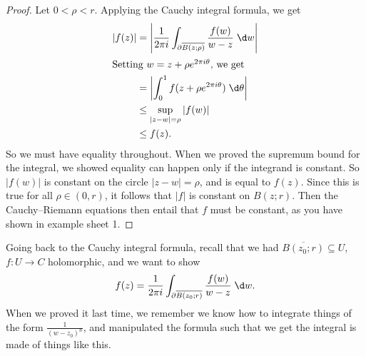 \documentclass[a4paper]{article}
\begin{document}
\begin{proof}
  Let $0 < \rho < r$. Applying the Cauchy integral formula, we get
  \begin{align*}
    |f(z)| &= \left|\frac{1}{2\pi i}\int_{\partial \overline{B(z; \rho)}} \frac{f(w)}{w - z}\;\d w\right|\\
    \intertext{Setting $w = z + \rho e^{2\pi i\theta}$, we get}
    &= \left|\int_0^1 f(z + \rho e^{2 \pi i \theta})\;\d \theta\right|\\
    &\leq \sup_{|z - w| = \rho} |f(w)|\\
    &\leq f(z).
  \end{align*}
  So we must have equality throughout. When we proved the supremum bound for the integral, we showed equality can happen only if the integrand is constant. So $|f(w)|$ is constant on the circle $|z - w| = \rho$, and is equal to $f(z)$. Since this is true for all $\rho \in (0, r)$, it follows that $|f|$ is constant on $B(z; r)$. Then the Cauchy--Riemann equations then entail that $f$ must be constant, as you have shown in example sheet 1.
\end{proof}
Going back to the Cauchy integral formula, recall that we had $\overline{B(z_0; r)} \subseteq U$, $f: U \to C$ holomorphic, and we want to show
\[
  f(z) = \frac{1}{2\pi i} \int_{\partial \overline{B(z_0; r)}} \frac{f(w)}{w - z}\;\d w.
\]
When we proved it last time, we remember we know how to integrate things of the form $\frac{1}{(w - z_0)^n}$, and manipulated the formula such that we get the integral is made of things like this.
\end{document}
